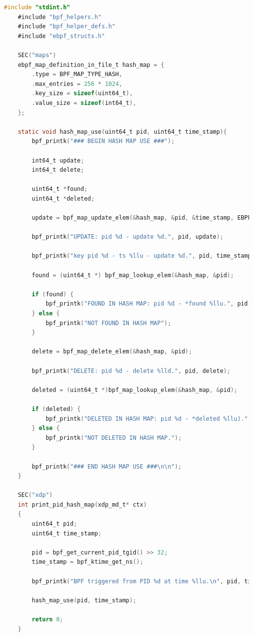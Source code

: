 \begin{lstlisting}[style=cstyle, language=C, caption={hash\_map\_use.c program using windows-ebpf-starter}, title=hash\_map\_use.c]
	#include "stdint.h"
	#include "bpf_helpers.h"
	#include "bpf_helper_defs.h"
	#include "ebpf_structs.h"
	
	SEC("maps")
	ebpf_map_definition_in_file_t hash_map = {
		.type = BPF_MAP_TYPE_HASH,
		.max_entries = 256 * 1024,
		.key_size = sizeof(uint64_t),
		.value_size = sizeof(int64_t),
	};
	
	static void hash_map_use(uint64_t pid, uint64_t time_stamp){
		bpf_printk("### BEGIN HASH MAP USE ###");
		
		int64_t update;
		int64_t delete;
		
		uint64_t *found;
		uint64_t *deleted;
		
		update = bpf_map_update_elem(&hash_map, &pid, &time_stamp, EBPF_ANY);
		
		bpf_printk("UPDATE: pid %d - update %d.", pid, update);
		
		bpf_printk("key pid %d - ts %llu - update %d.", pid, time_stamp, update);
		
		found = (uint64_t *) bpf_map_lookup_elem(&hash_map, &pid);
		
		if (found) {
			bpf_printk("FOUND IN HASH MAP: pid %d - *found %llu.", pid, *found);
		} else {
			bpf_printk("NOT FOUND IN HASH MAP");
		}
		
		delete = bpf_map_delete_elem(&hash_map, &pid);
		
		bpf_printk("DELETE: pid %d - delete %lld.", pid, delete);
		
		deleted = (uint64_t *)bpf_map_lookup_elem(&hash_map, &pid);
		
		if (deleted) {
			bpf_printk("DELETED IN HASH MAP: pid %d - *deleted %llu).", pid, *deleted);
		} else {
			bpf_printk("NOT DELETED IN HASH MAP.");
		}
		
		bpf_printk("### END HASH MAP USE ###\n\n");
	}
	
	SEC("xdp")
	int print_pid_hash_map(xdp_md_t* ctx)
	{
		uint64_t pid;
		uint64_t time_stamp;
		
		pid = bpf_get_current_pid_tgid() >> 32;
		time_stamp = bpf_ktime_get_ns(); 
		
		bpf_printk("BPF triggered from PID %d at time %llu.\n", pid, time_stamp);
		
		hash_map_use(pid, time_stamp);
		
		return 0;
	}
\end{lstlisting}

